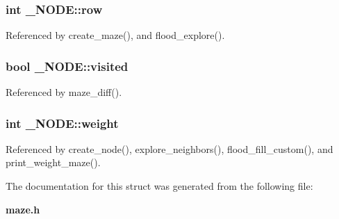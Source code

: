 \subsubsection[{row}]{\setlength{\rightskip}{0pt plus 5cm}int \-\_\-\-N\-O\-D\-E\-::row}\label{struct__NODE_a42380117246af64ca6d423451e8b5314}


Referenced by create\-\_\-maze(), and flood\-\_\-explore().

\subsubsection[{visited}]{\setlength{\rightskip}{0pt plus 5cm}bool \-\_\-\-N\-O\-D\-E\-::visited}\label{struct__NODE_a7129c4e2ec0513eb58a8d3581fec5d81}


Referenced by maze\-\_\-diff().

\subsubsection[{weight}]{\setlength{\rightskip}{0pt plus 5cm}int \-\_\-\-N\-O\-D\-E\-::weight}\label{struct__NODE_af4551dec0caa61f0b95a8cd025a73afa}


Referenced by create\-\_\-node(), explore\-\_\-neighbors(), flood\-\_\-fill\-\_\-custom(), and print\-\_\-weight\-\_\-maze().



The documentation for this struct was generated from the following file\-:\begin{DoxyCompactItemize}
\item 
{\bf maze.\-h}\end{DoxyCompactItemize}
